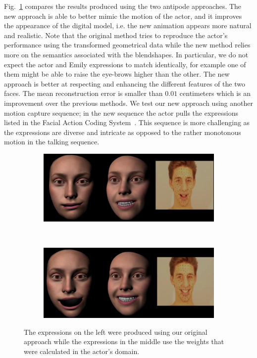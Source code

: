 Fig.~\ref{fig:resultcomp} compares the results produced using the two antipode approaches. The new approach is able to better mimic the motion of the actor, and it improves the appearance of the digital model, i.e. the new animation appears more natural and realistic. Note that the original method tries to reproduce the actor's performance using the transformed geometrical data while the new method relies more on the semantics associated with the blendshapes. In particular, we do not expect the actor and Emily expressions to match identically, for example one of them might be able to raise the eye-brows higher than the other. The new approach is better at respecting and enhancing the different features of the two faces. The mean reconstruction error is smaller than $0.01$ centimeters which is an improvement over the previous methods. We test our new approach using another motion capture sequence; in the new sequence the actor pulls the expressions listed in the Facial Action Coding System~\cite{FACS}. This sequence is more challenging as the expressions are diverse and intricate as opposed to the rather monotonous motion in the talking sequence.
\begin{figure}[htbp!]
        \centering
        \begin{subfigure}[b]{0.6\textwidth}
                \includegraphics[width=\textwidth]{img/comp4s.png}
        \end{subfigure} \\
        \begin{subfigure}[b]{0.6\textwidth}
                \includegraphics[width=\textwidth]{img/comp6s.png}
        \end{subfigure}
        \caption{The expressions on the left were produced using our original approach while the expressions in the middle use the weights that were calculated in the actor's domain. }\label{fig:resultcomp}
\end{figure}

